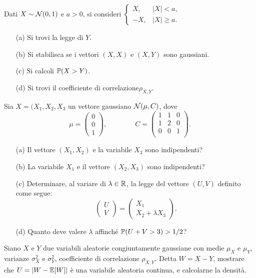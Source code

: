 \Esercizio{} %
Dati $X\sim\mathcal{N}(0,1)$ e $a>0$, si consideri $\begin{cases}X,&|X|<a,\\-X,&|X|\geq a.  \end{cases}$
\begin{enumerate}
\item [(a)] Si trovi la legge di $Y$.
\item [(b)] Si stabilisca se i vettori $(X,X)$ e $(X,Y)$ sono gaussiani.
\item [(c)] Si calcoli $\mathbb{P}(X>Y)$.
\item [(d)] Si trovi il coefficiente di correlazione$\rho_{X,Y}$.
\end{enumerate}

\Esercizio{} %
Sia $X=(X_1,X_2,X_3$ un vettore gaussiano $\mathcal{N}(\mu,C)$, dove
\[
\mu=\begin{pmatrix}
0 \\0
 \\1
\end{pmatrix},\qquad\qquad C=\begin{pmatrix}
1 & 1 & 0 \\
1 & 2 & 0 \\
0 &  0& 1 \\
\end{pmatrix}.
\]
\begin{enumerate}
\item [(a)] Il vettore $(X_1,X_2)$ e la variabile $X_3$ sono indipendenti?
\item [(b)] La variabile $X_1$ e il vettore $(X_2,X_3)$ sono indipendenti?
\item [(c)] Determinare, al variare di $\lambda\in\mathbb{R}$, la legge del vettore $(U,V)$ definito come segue:
\[
\begin{pmatrix}
U \\V

\end{pmatrix}=\begin{pmatrix}
X_1 \\X_2+\lambda X_3
\end{pmatrix}.
\]
\item [(d)] Quanto deve valere $\lambda$ affinché $\mathbb{P}(U+V>3)>1/2$?
\end{enumerate}

\Esercizio{} %
Siano $X$ e $Y$ due variabili aleatorie congiuntamente gaussiane con medie $\mu_X$ e $\mu_Y$, varianze $\sigma_X^2$ e $\sigma_Y^2$, coefficiente di correlazione $\rho_{X,Y}$. Detta $W=X-Y$, mostrare che $U=|W-\mathbb{E}[W]|$ è una variabile aleatoria continua, e calcolarne la densità.

